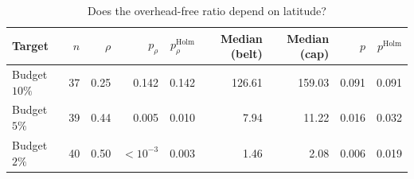 \begin{table}[t]
\centering
\caption{Does the overhead-free ratio depend on latitude?}
\label{tab:latitude_effect}
\footnotesize
\begin{tabular}{lrrrrrrrr}
\toprule
Target & $n$ & $\rho$ & $p_\rho$ & $p_\rho^{\mathrm{Holm}}$ & Median (belt) & Median (cap) & $p$ & $p^{\mathrm{Holm}}$ \\
\midrule
Budget $10\%$ & 37 & 0.25 & 0.142 & 0.142 & 126.61 & 159.03 & 0.091 & 0.091 \\
Budget $5\%$ & 39 & 0.44 & 0.005 & 0.010 & 7.94 & 11.22 & 0.016 & 0.032 \\
Budget $2\%$ & 40 & 0.50 & $<10^{-3}$ & 0.003 & 1.46 & 2.08 & 0.006 & 0.019 \\
\bottomrule
\end{tabular}
\end{table}
